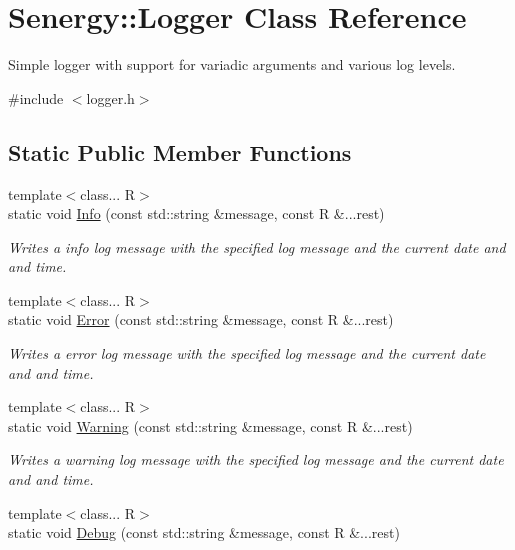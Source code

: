 \hypertarget{class_senergy_1_1_logger}{\section{Senergy\-:\-:Logger Class Reference}
\label{class_senergy_1_1_logger}
}


Simple logger with support for variadic arguments and various log levels.  




{\ttfamily \#include $<$logger.\-h$>$}

\subsection*{Static Public Member Functions}
\begin{DoxyCompactItemize}
\item 
{\footnotesize template$<$class... R$>$ }\\static void \hyperlink{class_senergy_1_1_logger_a917107d9c7bee19a3347dac8afc983f0}{Info} (const std\-::string \&message, const R \&...rest)
\begin{DoxyCompactList}\small\item\em Writes a info log message with the specified log message and the current date and and time. \end{DoxyCompactList}\item 
{\footnotesize template$<$class... R$>$ }\\static void \hyperlink{class_senergy_1_1_logger_a2d5b9ef97d8c0de884254562395a01a7}{Error} (const std\-::string \&message, const R \&...rest)
\begin{DoxyCompactList}\small\item\em Writes a error log message with the specified log message and the current date and and time. \end{DoxyCompactList}\item 
{\footnotesize template$<$class... R$>$ }\\static void \hyperlink{class_senergy_1_1_logger_ac68f5e14b8fe1bb3004d66289ff95150}{Warning} (const std\-::string \&message, const R \&...rest)
\begin{DoxyCompactList}\small\item\em Writes a warning log message with the specified log message and the current date and and time. \end{DoxyCompactList}\item 
{\footnotesize template$<$class... R$>$ }\\static void \hyperlink{class_senergy_1_1_logger_a2595f879ddfbbb8f8ef6f08d4a9d18f3}{Debug} (const std\-::string \&message, const R \&...rest)

\end{DoxyCompactItemize}
